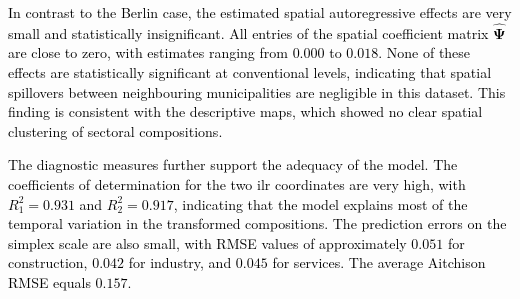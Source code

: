 \documentclass[12pt]{article}
\theoremstyle{plain}
\theoremstyle{definition}
\newcommand{\xmat}{\mathbf}
\begin{document}
\textcolor{black}{In contrast to the Berlin case, the estimated spatial autoregressive effects are very small and statistically insignificant. All entries of the spatial coefficient matrix $\hat{\xmat{\Psi}}$ are close to zero, with estimates ranging from $0.000$ to $0.018$. None of these effects are statistically significant at conventional levels, indicating that spatial spillovers between neighbouring municipalities are negligible in this dataset. This finding is consistent with the descriptive maps, which showed no clear spatial clustering of sectoral compositions.}

\textcolor{black}{The diagnostic measures further support the adequacy of the model. The coefficients of determination for the two ilr coordinates are very high, with $R^2_1=0.931$ and $R^2_2=0.917$, indicating that the model explains most of the temporal variation in the transformed compositions. The prediction errors on the simplex scale are also small, with RMSE values of approximately $0.051$ for construction, $0.042$ for industry, and $0.045$ for services. The average Aitchison RMSE equals $0.157$.}
\end{document}
